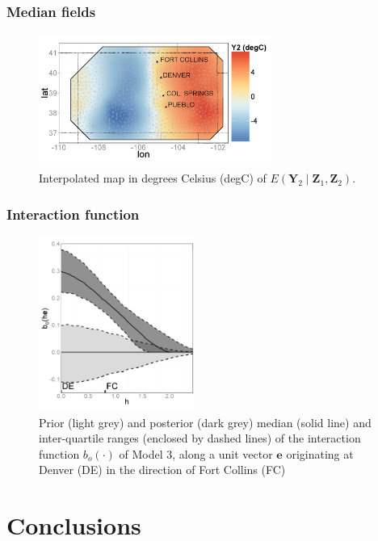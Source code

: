 \documentclass{beamer}
\newcommand{\Yvec}{\mathbf{Y}}
\newcommand{\Zvec}{\mathbf{Z}}
\newcommand{\E}{E}
\begin{document}
\begin{frame}
\frametitle{Median fields}
\begin{figure}
\includegraphics[width=3in]{Fig3a2.png}
\caption{Interpolated map in degrees Celsius (degC) of $\E(\Yvec_2 \mid  \Zvec_1,\Zvec_2)$.}
\end{figure}
\end{frame}


\begin{frame}
\frametitle{Interaction function}


\vspace{-0.1in}
\begin{figure}
\includegraphics[width=2in]{Fig3b.png}
\caption{\small Prior (light grey) and posterior (dark grey) median (solid line) and inter-quartile ranges (enclosed by dashed lines) of the interaction function $b_o(\cdot)$ of Model 3, along a unit vector $\mathbf{e}$ originating at Denver (DE) in the direction of Fort Collins (FC)}
\end{figure}

\end{frame}

\normalsize


\section{Conclusions}

\begin{frame}
\sectionpage
\end{frame}
\end{document}
